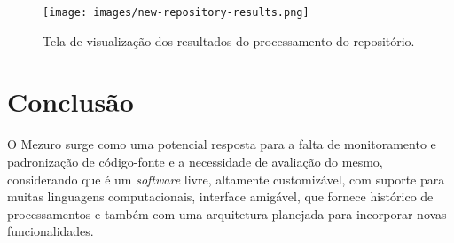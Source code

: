 \documentclass[12pt]{article}
\begin{document}
    \begin{figure}[H]
      \centering
      \texttt{[image: images/new-repository-results.png]}
      \caption{Tela de visualização dos resultados do processamento do repositório.}
      \label{fig:results}
    \end{figure}

\section{Conclusão}
O Mezuro surge como uma potencial resposta para a falta de monitoramento e padronização de código-fonte e a necessidade de avaliação do mesmo, considerando que é um \textit{software} livre, altamente customizável, com suporte para muitas linguagens computacionais, interface amigável, que fornece histórico de processamentos e também com uma arquitetura planejada para incorporar novas funcionalidades.



\end{document}
